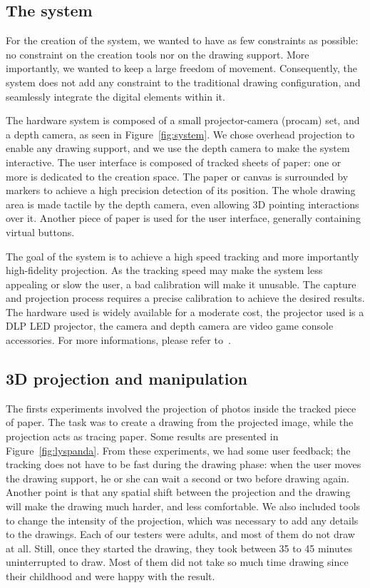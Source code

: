 \documentclass{article}
\begin{document}
\subsection*{The system}

For the creation of the system, we wanted to have as few constraints as possible: no constraint on the creation tools nor on the drawing support. More importantly, we wanted to keep a large freedom of movement. Consequently, the system does not add any constraint to the traditional drawing configuration, and seamlessly integrate the digital elements within it. 

The hardware system is composed of a small projector-camera (procam) set, and a depth camera, as seen in Figure~\ref{fig:system}. We chose overhead projection to enable any drawing support, and we use the depth camera to make the system interactive. The user interface is composed of tracked sheets of paper: one or more is dedicated to the creation space. The paper or canvas is surrounded by markers to achieve a high precision detection of its position. The whole drawing area is made tactile by the depth camera, even allowing 3D pointing interactions over it. Another piece of paper is used for the user interface, generally containing virtual buttons.

The goal of the system is to achieve a high speed tracking and more importantly high-fidelity projection. As the tracking speed may make the system less appealing or slow the user, a bad calibration will make it unusable. The capture and projection process requires a precise calibration to achieve the desired results. 
The hardware used is widely available for a moderate cost, the projector used is a DLP LED projector, the camera and depth camera are video game console accessories. For more informations, please refer to~\cite{laviole:2012}.
 

\subsection*{3D projection and manipulation}

The firsts experiments involved the projection of photos inside the tracked piece of paper. The task was to create a drawing from the projected image, while the projection acts as tracing paper. Some results are presented in Figure~\ref{fig:lyspanda}. From these experiments, we had some user feedback; the tracking does not have to be fast during the drawing phase: when the user moves the drawing support, he or she can wait a second or two before drawing again. Another point is that any spatial shift between the projection and the drawing will make the drawing much harder, and less comfortable. We also included tools to change the intensity of the projection, which was necessary to add any details to the drawings. Each of our testers were adults, and most of them do not draw at all. Still, once they started the drawing, they took between 35 to 45 minutes uninterrupted to draw. Most of them did not take so much time drawing since their childhood and were happy with the result. 
\end{document}
